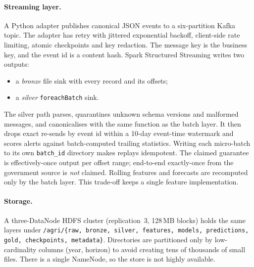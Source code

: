 \paragraph{Streaming layer.}
A Python adapter publishes canonical JSON events to a six-partition Kafka topic.
The adapter has retry with jittered exponential backoff, client-side rate limiting, atomic checkpoints and key redaction.
The message key is the business key, and the event id is a content hash.
Spark Structured Streaming writes two outputs:
\begin{itemize}
  \item a \emph{bronze} file sink with every record and its offsets;
  \item a \emph{silver} \texttt{foreachBatch} sink.
\end{itemize}
The silver path parses, quarantines unknown schema versions and malformed messages, and canonicalises with the same function as the batch layer.
It then drops exact re-sends by event id within a 10-day event-time watermark and scores alerts against batch-computed trailing statistics.
Writing each micro-batch to its own \texttt{batch\_id} directory makes replays idempotent.
The claimed guarantee is effectively-once output per offset range; end-to-end exactly-once from the government source is \emph{not} claimed.
Rolling features and forecasts are recomputed only by the batch layer. This trade-off keeps a single feature implementation.

\paragraph{Storage.}
A three-DataNode HDFS cluster (replication~3, 128\,MB blocks) holds the same layers under \texttt{/agri/\{raw, bronze, silver, features, models, predictions, gold, checkpoints, metadata\}}.
Directories are partitioned only by low-cardinality columns (year, horizon) to avoid creating tens of thousands of small files.
There is a single NameNode, so the store is not highly available.
